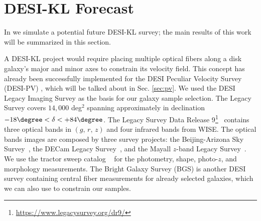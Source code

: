 \section{DESI-KL Forecast}
\label{sec:desi}

In \citep{xu2024KL} we simulate a potential future DESI-KL survey; the main results of this work will be summarized in this section.

A DESI-KL project would require placing multiple optical fibers along a disk galaxy's major and minor axes to constrain its velocity field. This concept has already been successfully implemented for the DESI Peculiar Velocity Survey (DESI-PV) \citep{DESIPV23}, which will be talked about in Sec. \ref{sec:pv}. We used the DESI Legacy Imaging Survey \citep{LS_overview} as the basis for our galaxy sample selection. The Legacy Survey covers $14,000$ deg$^{2}$ spanning approximately in declination $-18\degree< \delta < +84\degree$. The Legacy Survey Data Release 9\footnote{\url{https://www.legacysurvey.org/dr9/}}~\citep[LS DR9 from hereon][]{SDH+21} contains three optical bands in $(g,\,r,\,z)$ and four infrared bands from WISE. The optical bands images are composed by three survey projects: the Beijing-Arizona Sky Survey~\citep[BASS,][]{BASS}, the DECam Legacy Survey~\citep[DECaLS,][]{LS_overview}, and the Mayall $z$-band Legacy Survey~\citep[MzLS,][]{LS_overview}. We use the tractor sweep catalog ~\citep{LHM16,L20} for the photometry, shape, photo-$z$, and morphology measurements. The Bright Galaxy Survey (BGS) \citep{BGS_selection1, BGS_selection2} is another DESI survey containing central fiber measurements for already selected galaxies, which we can also use to constrain our samples.

